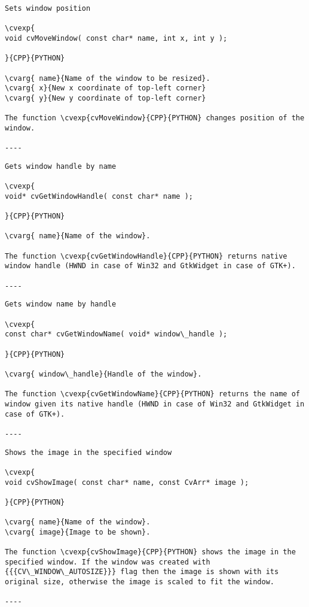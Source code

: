 \begin{verbatim}
Sets window position

\cvexp{
void cvMoveWindow( const char* name, int x, int y );

}{CPP}{PYTHON}

\cvarg{ name}{Name of the window to be resized}.
\cvarg{ x}{New x coordinate of top-left corner}
\cvarg{ y}{New y coordinate of top-left corner}

The function \cvexp{cvMoveWindow}{CPP}{PYTHON} changes position of the window.

----
\end{verbatim}
\begin{verbatim}
Gets window handle by name

\cvexp{
void* cvGetWindowHandle( const char* name );

}{CPP}{PYTHON}

\cvarg{ name}{Name of the window}.

The function \cvexp{cvGetWindowHandle}{CPP}{PYTHON} returns native window handle (HWND in case of Win32 and GtkWidget in case of GTK+).

----
\end{verbatim}
\begin{verbatim}
Gets window name by handle

\cvexp{
const char* cvGetWindowName( void* window\_handle );

}{CPP}{PYTHON}

\cvarg{ window\_handle}{Handle of the window}.

The function \cvexp{cvGetWindowName}{CPP}{PYTHON} returns the name of window given its native handle (HWND in case of Win32 and GtkWidget in case of GTK+).

----
\end{verbatim}
\begin{verbatim}
Shows the image in the specified window

\cvexp{
void cvShowImage( const char* name, const CvArr* image );

}{CPP}{PYTHON}

\cvarg{ name}{Name of the window}.
\cvarg{ image}{Image to be shown}.

The function \cvexp{cvShowImage}{CPP}{PYTHON} shows the image in the specified window. If the window was created with {{{CV\_WINDOW\_AUTOSIZE}}} flag then the image is shown with its original size, otherwise the image is scaled to fit the window.

----
\end{verbatim}
